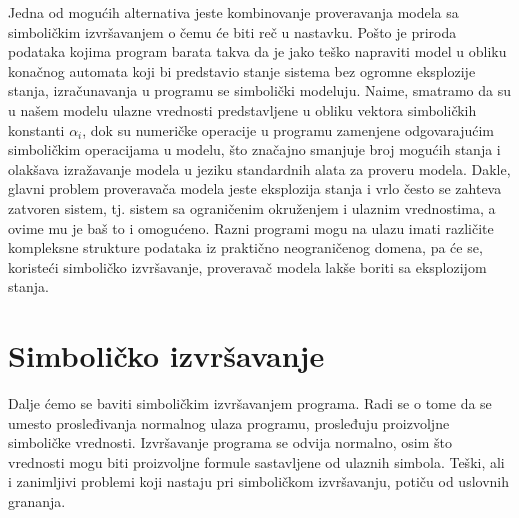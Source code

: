 \documentclass[a4paper]{article}
\begin{document}
Jedna od mogućih alternativa jeste kombinovanje proveravanja modela sa simboličkim izvršavanjem o čemu će biti reč u nastavku. Pošto je priroda podataka kojima program barata takva da je jako teško napraviti model u obliku konačnog automata koji bi predstavio stanje sistema bez ogromne eksplozije stanja, izračunavanja u programu se simbolički modeluju. Naime, smatramo da su u našem modelu ulazne vrednosti predstavljene u obliku vektora simboličkih konstanti $\alpha_i$, dok su numeričke operacije u programu zamenjene odgovarajućim simboličkim operacijama u modelu, što značajno smanjuje broj mogućih stanja i olakšava izražavanje modela u jeziku standardnih alata za proveru modela. Dakle, glavni problem proveravača modela jeste eksplozija stanja i vrlo često se zahteva zatvoren sistem, tj. sistem sa ograničenim okruženjem i ulaznim vrednostima, a ovime mu je baš to i omogućeno. Razni programi mogu na ulazu imati različite kompleksne strukture podataka iz praktično neograničenog domena, pa će se, koristeći simboličko izvršavanje, proveravač modela lakše boriti sa eksplozijom stanja. 
 

\section{Simboličko izvršavanje}
\label{sec:naslov2}
Dalje ćemo se baviti simboličkim izvršavanjem programa. Radi se o tome da se umesto prosleđivanja normalnog ulaza programu, prosleđuju proizvoljne simboličke vrednosti. Izvršavanje programa se odvija normalno, osim što vrednosti mogu biti proizvoljne formule sastavljene od ulaznih simbola. Teški, ali i zanimljivi problemi koji nastaju pri simboličkom izvršavanju, potiču od uslovnih grananja.\\
\end{document}
